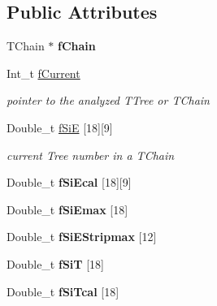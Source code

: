 \subsection*{Public Attributes}
\begin{DoxyCompactItemize}
\item 
\hypertarget{classAnalyzer_abe391c85bba5d5f207e4545822079491}{
TChain $\ast$ {\bfseries fChain}}
\label{classAnalyzer_abe391c85bba5d5f207e4545822079491}

\item 
\hypertarget{classAnalyzer_ae2858ca4bc4b407377b0895bf26560fe}{
Int\_\-t \hyperlink{classAnalyzer_ae2858ca4bc4b407377b0895bf26560fe}{fCurrent}}
\label{classAnalyzer_ae2858ca4bc4b407377b0895bf26560fe}

\begin{DoxyCompactList}\small\item\em pointer to the analyzed TTree or TChain \end{DoxyCompactList}\item 
\hypertarget{classAnalyzer_a383f04a660f9015786c52f7056f4e063}{
Double\_\-t \hyperlink{classAnalyzer_a383f04a660f9015786c52f7056f4e063}{fSiE} \mbox{[}18\mbox{]}\mbox{[}9\mbox{]}}
\label{classAnalyzer_a383f04a660f9015786c52f7056f4e063}

\begin{DoxyCompactList}\small\item\em current Tree number in a TChain \end{DoxyCompactList}\item 
\hypertarget{classAnalyzer_a4313d7457257af33b51346b8a14a7367}{
Double\_\-t {\bfseries fSiEcal} \mbox{[}18\mbox{]}\mbox{[}9\mbox{]}}
\label{classAnalyzer_a4313d7457257af33b51346b8a14a7367}

\item 
\hypertarget{classAnalyzer_ac69100098e7fe1efe06bd590b8bd88a1}{
Double\_\-t {\bfseries fSiEmax} \mbox{[}18\mbox{]}}
\label{classAnalyzer_ac69100098e7fe1efe06bd590b8bd88a1}

\item 
\hypertarget{classAnalyzer_ae4458a37a406fb80d11217ce33627bcb}{
Double\_\-t {\bfseries fSiEStripmax} \mbox{[}12\mbox{]}}
\label{classAnalyzer_ae4458a37a406fb80d11217ce33627bcb}

\item 
\hypertarget{classAnalyzer_a0f80e92c70741c8f498913a0c89f5bd6}{
Double\_\-t {\bfseries fSiT} \mbox{[}18\mbox{]}}
\label{classAnalyzer_a0f80e92c70741c8f498913a0c89f5bd6}

\item 
\hypertarget{classAnalyzer_afe82d81688f53f9bf48783f321ca5b07}{
Double\_\-t {\bfseries fSiTcal} \mbox{[}18\mbox{]}}
\label{classAnalyzer_afe82d81688f53f9bf48783f321ca5b07}


\end{DoxyCompactItemize}
